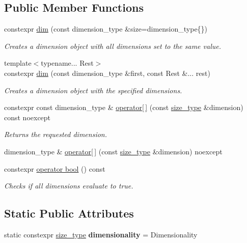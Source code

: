 \subsection*{Public Member Functions}
\begin{DoxyCompactItemize}
\item 
constexpr \hyperlink{structgko_1_1dim_a72c243d90a8aaed7d51b4d2547cba83d}{dim} (const dimension\+\_\+type \&size=dimension\+\_\+type\{\})
\begin{DoxyCompactList}\small\item\em Creates a dimension object with all dimensions set to the same value. \end{DoxyCompactList}\item 
{\footnotesize template$<$typename... Rest$>$ }\\constexpr \hyperlink{structgko_1_1dim_a09b90cec3c5778596ef75bed95ab8850}{dim} (const dimension\+\_\+type \&first, const Rest \&... rest)
\begin{DoxyCompactList}\small\item\em Creates a dimension object with the specified dimensions. \end{DoxyCompactList}\item 
constexpr const dimension\+\_\+type \& \hyperlink{structgko_1_1dim_a33151623775cbe4c229a3bd59046de36}{operator\mbox{[}$\,$\mbox{]}} (const \hyperlink{namespacegko_a6e5c95df0ae4e47aab2f604a22d98ee7}{size\+\_\+type} \&dimension) const noexcept
\begin{DoxyCompactList}\small\item\em Returns the requested dimension. \end{DoxyCompactList}\item 
dimension\+\_\+type \& \hyperlink{structgko_1_1dim_a02bf1bbda6859052e8b881dfd43b64a9}{operator\mbox{[}$\,$\mbox{]}} (const \hyperlink{namespacegko_a6e5c95df0ae4e47aab2f604a22d98ee7}{size\+\_\+type} \&dimension) noexcept
\item 
constexpr \hyperlink{structgko_1_1dim_a250f37a972c7e3fd0cc4c173e46e577c}{operator bool} () const
\begin{DoxyCompactList}\small\item\em Checks if all dimensions evaluate to true. \end{DoxyCompactList}\end{DoxyCompactItemize}
\subsection*{Static Public Attributes}
\begin{DoxyCompactItemize}
\item 
\mbox{\label{structgko_1_1dim_a72d29ecf3590a02a8977efa34c03cec1}} 
static constexpr \hyperlink{namespacegko_a6e5c95df0ae4e47aab2f604a22d98ee7}{size\+\_\+type} {\bfseries dimensionality} = Dimensionality
\end{DoxyCompactItemize}
